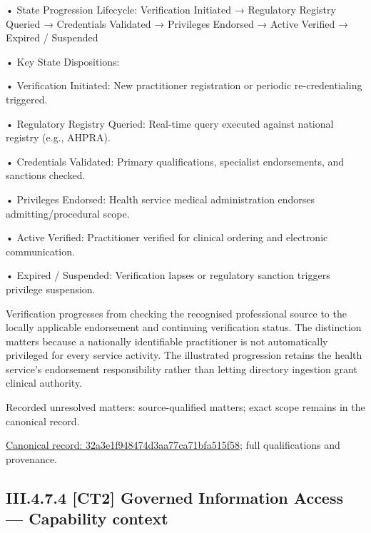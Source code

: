 •
State Progression Lifecycle: Verification Initiated → Regulatory Registry Queried → Credentials Validated → Privileges Endorsed → Active Verified → Expired / Suspended



•
Key State Dispositions:



•
Verification Initiated: New practitioner registration or periodic re-credentialing triggered.



•
Regulatory Registry Queried: Real-time query executed against national registry (e.g., AHPRA).



•
Credentials Validated: Primary qualifications, specialist endorsements, and sanctions checked.



•
Privileges Endorsed: Health service medical administration endorses admitting/procedural scope.



•
Active Verified: Practitioner verified for clinical ordering and electronic communication.



•
Expired / Suspended: Verification lapses or regulatory sanction triggers privilege suspension.



Verification progresses from checking the recognised professional source to the locally applicable endorsement and continuing verification status. The distinction matters because a nationally identifiable practitioner is not automatically privileged for every service activity. The illustrated progression retains the health service's endorsement responsibility rather than letting directory ingestion grant clinical authority.


{\small Recorded unresolved matters: source-qualified matters; exact scope remains in the canonical record.}\par
{\footnotesize \href{../../../../../../../../continuum/business/business-process/32a3e1f948474d3aa77ca71bfa515f58.md}{Canonical record: 32a3e1f948474d3aa77ca71bfa515f58}; full qualifications and provenance.}\par
\subsection*{III.4.7.4 [CT2] Governed Information Access — Capability context}
\label{navigation:III.4.7.4}

